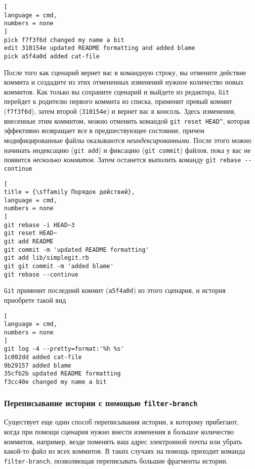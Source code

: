 \documentclass[%
	11pt,
	a4paper,
	utf8,
		]{article}
\begin{document}
\begin{lstlisting}[
language = cmd,
numbers = none
]
pick f7f3f6d changed my name a bit
edit 310154e updated README formatting and added blame
pick a5f4a0d added cat-file 
\end{lstlisting}

После того как сценарий вернет вас в командную строку, вы отмените действие коммита и создадите из этих отмененных изменений нужное количество новых коммитов. Как только вы сохраните сценарий и выйдете из редактора, \texttt{Git} перейдет к родителю первого коммита из списка, применит превый коммит (\texttt{f7f3f6d}), затем второй (\texttt{310154e})  и вернет вас в консоль. Здесь изменения, внесенные этим коммитом, можно отменить командой \lstinline{git reset HEAD^}, которая эффективно возвращает все в предшествующее состояние, причем модифицированные файлы оказываются \emph{неиндексированными}. После этого можно начинать индексацию (\texttt{git add}) и фиксацию (\texttt{git commit}) файлов, пока у вас не появится \emph{несколько коммитов}. Затем останется выполить команду \verb|git rebase --continue|

\begin{lstlisting}[
title = {\sffamily Порядок действий},
language = cmd,
numbers = none
]
git rebase -i HEAD~3
git reset HEAD~
git add README
git commit -m 'updated README formatting'
git add lib/simplegit.rb
git git commit -m 'added blame'
git rebase --continue
\end{lstlisting}

\texttt{Git} применит последний коммит (\texttt{a5f4a0d}) из этого сценария, и история приобрете такой вид

\begin{lstlisting}[
language = cmd,
numbers = none
]
git log -4 --pretty=format:'%h %s'
1c002dd added cat-file
9b29157 added blame
35cfb2b updated README formatting
f3cc40e changed my name a bit
\end{lstlisting}


\subsubsection{Переписывание истории с помощью \texttt{filter-branch}}

Существует еще один способ переписывания истории, к которому прибегают, когда при помощи сценария нужно внести изменения в большое количество коммитов, например, везде поменять ваш адрес электронной почты или убрать какой-то файл из всех коммитов. В таких случаях на помощь приходит команда \lstinline{filter-branch}, позволяющая переписывать большие фрагменты истории.
\end{document}
